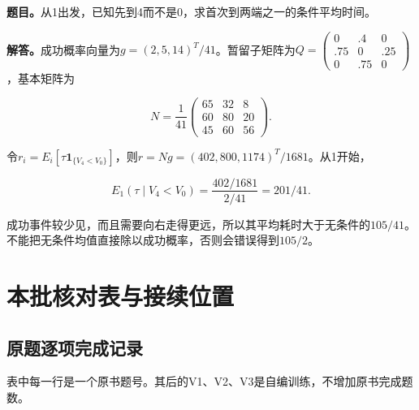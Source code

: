 \documentclass[
  11pt,
  a4paper,
  UTF8,
  fontset=fandol]{ctexart}
\begin{document}
\textbf{题目。}从1出发，已知先到4而不是0，求首次到两端之一的条件平均时间。

\textbf{解答。}成功概率向量为\(g=(2,5,14)^T/41\)。暂留子矩阵为\(Q=\left(\begin{smallmatrix}0&.4&0\\.75&0&.25\\0&.75&0\end{smallmatrix}\right)\)，基本矩阵为

\[
N=\frac1{41}\begin{pmatrix}65&32&8\\60&80&20\\45&60&56\end{pmatrix}.
\]

令\(r_i=E_i[\tau\mathbf1_{\{V_4<V_0\}}]\)，则\(r=Ng=(402,800,1174)^T/1681\)。从1开始，

\[
\boxed{E_1(\tau\mid V_4<V_0)=\frac{402/1681}{2/41}=201/41.}
\]

成功事件较少见，而且需要向右走得更远，所以其平均耗时大于无条件的\(105/41\)。不能把无条件均值直接除以成功概率，否则会错误得到\(105/2\)。

\newpage

\section{本批核对表与接续位置}\label{ux672cux6279ux6838ux5bf9ux8868ux4e0eux63a5ux7eedux4f4dux7f6e}

\subsection{原题逐项完成记录}\label{ux539fux9898ux9010ux9879ux5b8cux6210ux8bb0ux5f55}

表中每一行是一个原书题号。其后的V1、V2、V3是自编训练，不增加原书完成题数。
\end{document}
